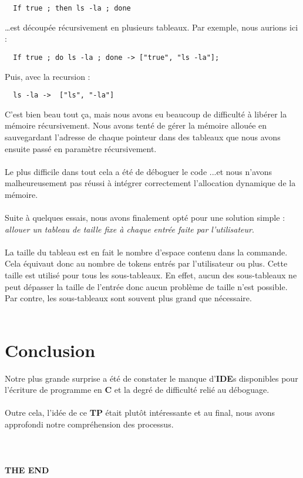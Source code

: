 \documentclass{article}
\begin{document}
\begin{verbatim}
  If true ; then ls -la ; done    
\end{verbatim}
\leavevmode
…est découpée récursivement en plusieurs tableaux. 
\leavevmode
Par exemple, nous aurions ici :
\begin{verbatim}
  If true ; do ls -la ; done -> ["true", "ls -la"];
\end{verbatim}
\leavevmode
Puis, avec la recursion :
\begin{verbatim}
  ls -la ->  ["ls", "-la"]
\end{verbatim}
\leavevmode
C’est bien beau tout ça, mais nous avons eu beaucoup de difficulté à libérer la mémoire récursivement. Nous avons tenté de gérer la mémoire allouée en sauvegardant l’adresse de chaque pointeur dans des tableaux que nous avons ensuite passé en paramètre récursivement.
\\\\
Le plus difficile dans tout cela a été de déboguer le code ...et nous n'avons malheureusement pas réussi à intégrer correctement l'allocation dynamique de la mémoire.
\\\\
Suite à quelques essais, nous avons finalement opté pour une solution simple : \textit{allouer un tableau de taille fixe à chaque entrée faite par l'utilisateur}.
\\\\
La taille du tableau est en fait le nombre d'espace contenu dans la commande. Cela équivaut donc au nombre de tokens entrés par l'utilisateur ou plus. Cette taille est utilisé pour tous les sous-tableaux. En effet, aucun des sous-tableaux ne peut dépasser la taille de l'entrée donc aucun problème de taille n'est possible. Par contre, les sous-tableaux sont souvent plus grand que nécessaire.
\\\\

\section{Conclusion}

Notre plus grande surprise a été de constater le manque d’\textbf{IDE}s disponibles pour l'écriture de programme en \textbf{C} et la degré de difficulté relié au déboguage.
\\\\
Outre cela, l'idée de ce \textbf{TP} était plutôt intéressante et au final, nous avons  approfondi notre compréhension des processus. 
\\\\
\\\\
\textbf{THE END}
\end{document}
